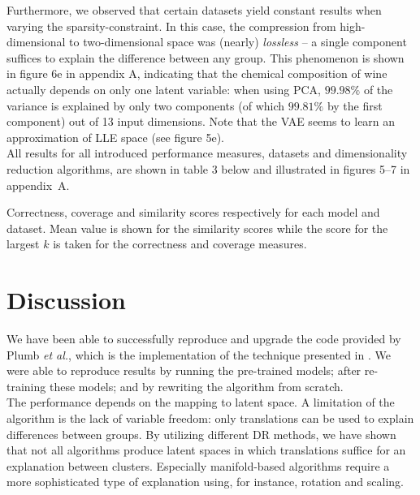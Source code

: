 Furthermore, we observed that certain datasets yield constant results when varying the sparsity-constraint. In this case, the compression from high-dimensional to two-dimensional space was (nearly) \textit{lossless} -- a single component suffices to explain the difference between any group. This phenomenon is shown in figure 6e in appendix A, indicating that the chemical composition of wine actually depends on only one latent variable: when using PCA, $99.98\%$ of the variance is explained by only two components (of which $99.81\%$ by the first component) out of 13 input dimensions. Note that the VAE seems to learn an approximation of LLE space (see figure 5e).\\

All results for all introduced performance measures, datasets and dimensionality reduction algorithms, are shown in table 3 below and illustrated in figures 5--7 in appendix~A.


\begin{table}[h]
  \begin{adjustwidth}{-3cm}{-3cm}
    \scriptsize
    \centering
    
  \end{adjustwidth}
  \caption{Correctness, coverage and similarity scores respectively for each model and dataset. Mean value is shown for the similarity scores while the score for the largest $k$ is taken for the correctness and coverage measures.}
\end{table}


\section{Discussion}
We have been able to successfully reproduce and upgrade the code provided by Plumb \textit{et al.}, which is the implementation of the technique presented in \citep{plumb2020explaining}. We were able to reproduce results by running the pre-trained models; after re-training these models; and by rewriting the algorithm from scratch.\\

The performance depends on the mapping to latent space. A limitation of the algorithm is the lack of variable freedom: only translations can be used to explain differences between groups. By utilizing different DR methods, we have shown that not all algorithms produce latent spaces in which translations suffice for an explanation between clusters. Especially manifold-based algorithms require a more sophisticated type of explanation using, for instance, rotation and scaling.\\

